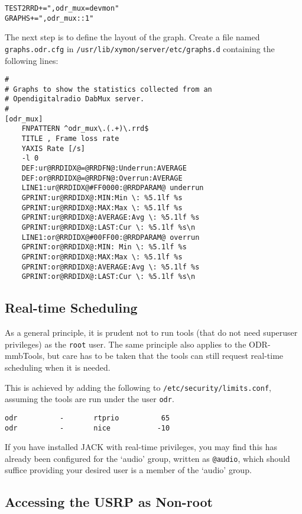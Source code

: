 \begin{verbatim}
TEST2RRD+=",odr_mux=devmon"
GRAPHS+=",odr_mux::1"
\end{verbatim}

The next step is to define the layout of the graph.
Create a file named \verb+graphs.odr.cfg+ in
\verb+/usr/lib/xymon/server/etc/graphs.d+ containing the following lines:

\begin{verbatim}
#
# Graphs to show the statistics collected from an
# Opendigitalradio DabMux server.
#
[odr_mux]
	FNPATTERN ^odr_mux\.(.+)\.rrd$
	TITLE , Frame loss rate
	YAXIS Rate [/s]
	-l 0
	DEF:ur@RRDIDX@=@RRDFN@:Underrun:AVERAGE
	DEF:or@RRDIDX@=@RRDFN@:Overrun:AVERAGE
	LINE1:ur@RRDIDX@#FF0000:@RRDPARAM@ underrun
	GPRINT:ur@RRDIDX@:MIN:Min \: %5.1lf %s
	GPRINT:ur@RRDIDX@:MAX:Max \: %5.1lf %s
	GPRINT:ur@RRDIDX@:AVERAGE:Avg \: %5.1lf %s
	GPRINT:ur@RRDIDX@:LAST:Cur \: %5.1lf %s\n
	LINE1:or@RRDIDX@#00FF00:@RRDPARAM@ overrun
	GPRINT:or@RRDIDX@:MIN: Min \: %5.1lf %s
	GPRINT:or@RRDIDX@:MAX:Max \: %5.1lf %s
	GPRINT:or@RRDIDX@:AVERAGE:Avg \: %5.1lf %s
	GPRINT:or@RRDIDX@:LAST:Cur \: %5.1lf %s\n
\end{verbatim}


\subsection{Real-time Scheduling}

As a general principle, it is prudent not to run tools (that do not need superuser
privileges) as the \texttt{root} user. The same principle also applies to the
ODR-mmbTools, but care has to be taken that the tools can still request real-time
scheduling when it is needed.

This is achieved by adding the following to \texttt{/etc/security/limits.conf},
assuming the tools are run under the user \texttt{odr}.

\begin{lstlisting}
odr          -       rtprio          65
odr          -       nice           -10
\end{lstlisting}

If you have installed JACK with real-time privileges, you may find this has
already been configured for the `audio' group, written as \texttt{@audio}, which
should suffice providing your desired user is a member of the `audio' group.

\subsection{Accessing the USRP as Non-root}


